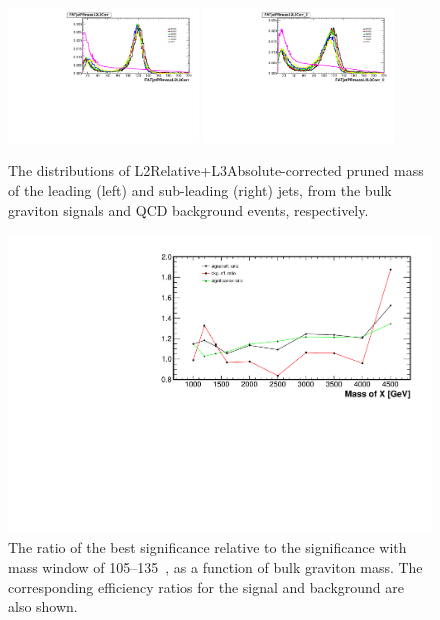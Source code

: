 \begin{figure}[htbp]
   \centering
   \includegraphics[width=0.45\textwidth]{figures/optimization/mass/FATjetPRmassL2L3Corr.pdf}
   \includegraphics[width=0.45\textwidth]{figures/optimization/mass/FATjetPRmassL2L3Corr_2.pdf}
   \caption{The distributions of L2Relative+L3Absolute-corrected 
     pruned mass of the leading (left) and sub-leading (right) jets, 
     from the bulk graviton signals and QCD background events,
     respectively. }
   \label{fig:leadsubmasscorr}
\end{figure}



\begin{figure}[!htb]
  \begin{center}
    \includegraphics[width=.9\textwidth]{figures/optimization/mass/dihiggs_bestWindow_ratio.pdf}
  \end{center}
  \caption{The ratio of the best significance relative to the significance 
 with mass window of 105--135~\GeV,  as a function 
of bulk graviton mass. The corresponding efficiency ratios for the signal 
 and background are also shown. }  
  \label{fig:sigratiomass}
\end{figure}


